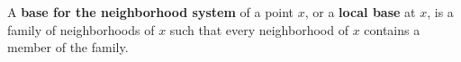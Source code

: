 A \textbf{base for the neighborhood system} of a point $x$, or a \textbf{local base} at $x$, is a family of neighborhoods of $x$ such that every neighborhood of $x$ contains a member of the family.
